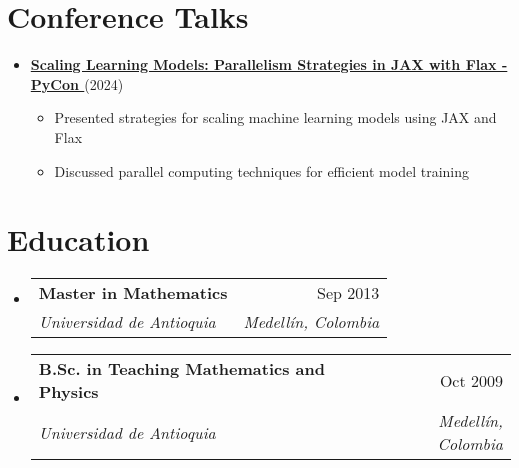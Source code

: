 \documentclass[letterpaper,11pt]{article}
\makeatletter
\newcommand{\resumeSubheading}[4]{
  \vspace{-2pt}
  \item[]
  \begin{tabular*}{\textwidth}{@{\extracolsep{\fill}}l r}
    \textbf{#1} & #2 \\
    \textit{#3} & \textit{#4} \\
  \end{tabular*}
  \vspace{-5pt}
}
\makeatother
\begin{document}
\section{Conference Talks}
\begin{itemize}[leftmargin=*]
    \item \textbf{\href{https://www.youtube.com/watch?v=m4hP1soE414}{Scaling Learning Models: Parallelism Strategies in JAX with Flax - PyCon \faYoutube}} (2024)
    \begin{itemize}
        \item Presented strategies for scaling machine learning models using JAX and Flax
        \item Discussed parallel computing techniques for efficient model training
    \end{itemize}
\end{itemize}

\section{Education}
\begin{itemize}[leftmargin=0pt, itemindent=0pt, label={}]
\resumeSubheading
{Master in Mathematics}{Sep 2013}
{Universidad de Antioquia}{Medellín, Colombia}

\resumeSubheading
{B.Sc. in Teaching Mathematics and Physics}{Oct 2009}
{Universidad de Antioquia}{Medellín, Colombia}
\end{itemize}
\end{document}
